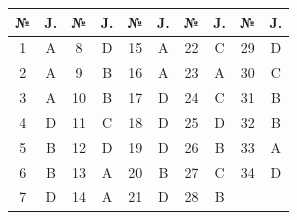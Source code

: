 \begin{table}[!ht]
\centering
\begin{tabular}{|c|c|c|c|c|c|c|c|c|c|}
\hline
№ & J. & № & J. & № & J. & № & J. & № & J. \\ \hline
1 & A & 8 & D & 15 & A & 22 & C & 29 & D \\ \hline
2 & A & 9 & B & 16 & A & 23 & A & 30 & C \\ \hline
3 & A & 10 & B & 17 & D & 24 & C & 31 & B \\ \hline
4 & D & 11 & C & 18 & D & 25 & D & 32 & B \\ \hline
5 & B & 12 & D & 19 & D & 26 & B & 33 & A \\ \hline
6 & B & 13 & A & 20 & B & 27 & C & 34 & D \\ \hline
7 & D & 14 & A & 21 & D & 28 & B & & \\ \hline
\end{tabular}
\end{table}